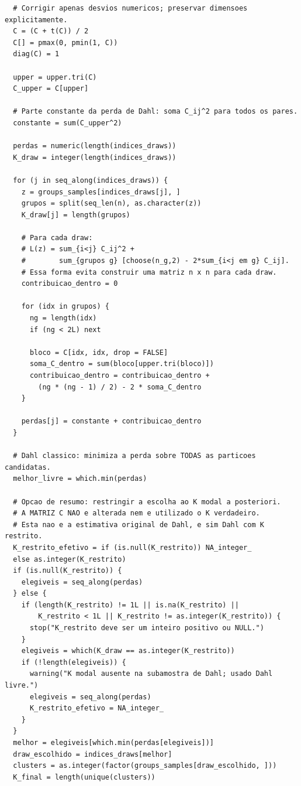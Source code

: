 \begin{verbatim}
  # Corrigir apenas desvios numericos; preservar dimensoes explicitamente.
  C = (C + t(C)) / 2
  C[] = pmax(0, pmin(1, C))
  diag(C) = 1
  
  upper = upper.tri(C)
  C_upper = C[upper]
  
  # Parte constante da perda de Dahl: soma C_ij^2 para todos os pares.
  constante = sum(C_upper^2)
  
  perdas = numeric(length(indices_draws))
  K_draw = integer(length(indices_draws))
  
  for (j in seq_along(indices_draws)) {
    z = groups_samples[indices_draws[j], ]
    grupos = split(seq_len(n), as.character(z))
    K_draw[j] = length(grupos)
    
    # Para cada draw:
    # L(z) = sum_{i<j} C_ij^2 +
    #        sum_{grupos g} [choose(n_g,2) - 2*sum_{i<j em g} C_ij].
    # Essa forma evita construir uma matriz n x n para cada draw.
    contribuicao_dentro = 0
    
    for (idx in grupos) {
      ng = length(idx)
      if (ng < 2L) next
      
      bloco = C[idx, idx, drop = FALSE]
      soma_C_dentro = sum(bloco[upper.tri(bloco)])
      contribuicao_dentro = contribuicao_dentro +
        (ng * (ng - 1) / 2) - 2 * soma_C_dentro
    }
    
    perdas[j] = constante + contribuicao_dentro
  }
  
  # Dahl classico: minimiza a perda sobre TODAS as particoes candidatas.
  melhor_livre = which.min(perdas)
  
  # Opcao de resumo: restringir a escolha ao K modal a posteriori.
  # A MATRIZ C NAO e alterada nem e utilizado o K verdadeiro.
  # Esta nao e a estimativa original de Dahl, e sim Dahl com K restrito.
  K_restrito_efetivo = if (is.null(K_restrito)) NA_integer_
  else as.integer(K_restrito)
  if (is.null(K_restrito)) {
    elegiveis = seq_along(perdas)
  } else {
    if (length(K_restrito) != 1L || is.na(K_restrito) ||
        K_restrito < 1L || K_restrito != as.integer(K_restrito)) {
      stop("K_restrito deve ser um inteiro positivo ou NULL.")
    }
    elegiveis = which(K_draw == as.integer(K_restrito))
    if (!length(elegiveis)) {
      warning("K modal ausente na subamostra de Dahl; usado Dahl livre.")
      elegiveis = seq_along(perdas)
      K_restrito_efetivo = NA_integer_
    }
  }
  melhor = elegiveis[which.min(perdas[elegiveis])]
  draw_escolhido = indices_draws[melhor]
  clusters = as.integer(factor(groups_samples[draw_escolhido, ]))
  K_final = length(unique(clusters))
  

\end{verbatim}
